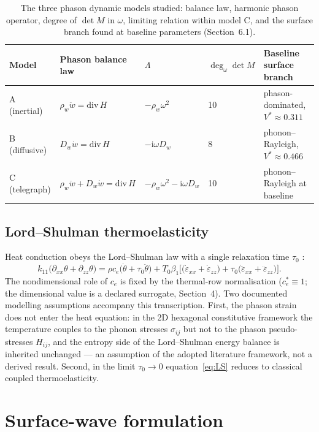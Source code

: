 \documentclass[11pt]{article}
\newcommand{\e}{\varepsilon}
\newcommand{\om}{\omega}
\newcommand{\sig}{\sigma}
\newcommand{\tht}{\theta}
\newcommand{\Dw}{D_w}
\newcommand{\rw}{\rho_w}
\begin{document}
\begin{table}[t]
\centering
\caption{The three phason dynamic models studied: balance law, harmonic phason operator, degree of $\det M$ in $\om$, limiting relation within model C, and the surface branch found at baseline parameters (Section~6.1).}
\label{tab:models}
\small
\begin{tabular}{@{}lllll@{}}
\toprule
Model & Phason balance law & $\Lambda$ & $\deg_\om\det M$ & Baseline surface branch \\
\midrule
A (inertial) & $\rw\ddot w=\mathrm{div}\,H$ & $-\rw\om^2$ & 10 & phason-dominated, $V^*\approx0.311$ \\
B (diffusive) & $\Dw\dot w=\mathrm{div}\,H$ & $-\mathrm{i}\om\Dw$ & 8 & phonon--Rayleigh, $V^*\approx0.466$ \\
C (telegraph) & $\rw\ddot w+\Dw\dot w=\mathrm{div}\,H$ & $-\rw\om^2-\mathrm{i}\om\Dw$ & 10 & phonon--Rayleigh at baseline \\
\bottomrule
\end{tabular}
\end{table}

\subsection{Lord--Shulman thermoelasticity}

Heat conduction obeys the Lord--Shulman law with a single relaxation time $\tau_0$ \cite{lord1967}:
\begin{equation}
k_{11}\big(\partial_{xx}\tht+\partial_{zz}\tht\big)=\rho c_e\big(\dot\tht+\tau_0\ddot\tht\big)+T_0\beta_1\Big[\big(\dot\e_{xx}+\dot\e_{zz}\big)+\tau_0\big(\ddot\e_{xx}+\ddot\e_{zz}\big)\Big]. \label{eq:LS}
\end{equation}
The nondimensional role of $c_e$ is fixed by the thermal-row normalisation ($c_e^*\equiv1$; the dimensional value is a declared surrogate, Section~4). Two documented modelling assumptions accompany this transcription. First, the phason strain does not enter the heat equation: in the 2D hexagonal constitutive framework \cite{yang2014,wang2021,li2024ijhmt} the temperature couples to the phonon stresses $\sig_{ij}$ but not to the phason pseudo-stresses $H_{ij}$, and the entropy side of the Lord--Shulman energy balance is inherited unchanged --- an assumption of the adopted literature framework, not a derived result. Second, in the limit $\tau_0\to0$ equation~\eqref{eq:LS} reduces to classical coupled thermoelasticity.

\section{Surface-wave formulation}
\end{document}
